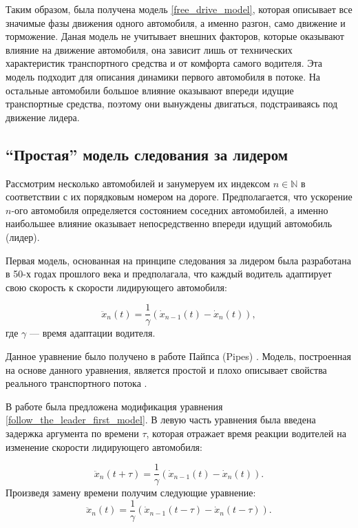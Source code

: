 \documentclass[12pt, a4paper]{extarticle}
\numberwithin{equation}{section}
\numberwithin{figure}{section}
\begin{document}
Таким образом, была получена модель \eqref{free_drive_model}, которая описывает все значимые фазы движения одного автомобиля, а именно разгон, само движение и торможение. Даная модель не учитывает внешних факторов, которые оказывают влияние на движение автомобиля, она зависит лишь от технических характеристик транспортного средства и от комфорта самого водителя. Эта модель подходит для описания динамики первого автомобиля в потоке. На остальные автомобили большое влияние оказывают впереди идущие транспортные средства, поэтому они вынуждены двигаться, подстраиваясь под движение лидера.

\subsection{``Простая'' модель следования за лидером}

Рассмотрим несколько автомобилей и занумеруем их индексом $n \in \mathbb{N}$ в соответствии с их порядковым номером на дороге. Предполагается, что ускорение $n$-ого автомобиля определяется состоянием соседних автомобилей, а именно наибольшее влияние оказывает непосредственно впереди идущий автомобиль (лидер).

Первая модель, основанная на принципе следования за лидером была разработана в 50-х годах прошлого века и предполагала, что каждый водитель адаптирует свою скорость к скорости лидирующего автомобиля:

\begin{equation} \label{follow_the_leader_first_model}
\ddot{x}_n(t) = \dfrac{1}{\gamma} (\dot{x}_{n-1}(t) - \dot{x}_{n}(t)), 
\end{equation}
где $\gamma$ --- время адаптации водителя.

Данное уравнение было получено в работе Пайпса (Pipes) \cite{FirstFollowTheLeaderModel}. Модель, построенная на основе данного уравнения, является простой и плохо описывает свойства реального транспортного потока \cite{Shvetsov}.

В работе \cite{RefineFirstFollowTheLeaderModel} была предложена модификация уравнения \eqref{follow_the_leader_first_model}. В левую часть уравнения была введена задержка аргумента по времени $\tau$, которая отражает время реакции водителей на изменение скорости лидирующего автомобиля:

\begin{equation*}
\ddot{x}_n(t+\tau) = \dfrac{1}{\gamma} (\dot{x}_{n-1}(t) - \dot{x}_{n}(t)).
\end{equation*}
Произведя замену времени получим следующие уравнение:
\begin{equation} \label{follow_the_leader_with_two_delay}
\ddot{x}_n(t) = \dfrac{1}{\gamma} (\dot{x}_{n-1}(t-\tau) - \dot{x}_{n}(t-\tau)).
\end{equation}
\end{document}
